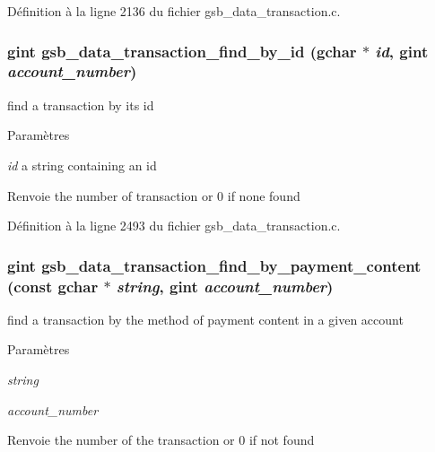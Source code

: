 Définition à la ligne 2136 du fichier gsb\_\-data\_\-transaction.c.

\subsubsection[{gsb\_\-data\_\-transaction\_\-find\_\-by\_\-id}]{\setlength{\rightskip}{0pt plus 5cm}gint gsb\_\-data\_\-transaction\_\-find\_\-by\_\-id (gchar $\ast$ {\em id}, \/  gint {\em account\_\-number})}\label{gsb__data__transaction_8c_a8904a22be0f714a36c52e4924491e959}
find a transaction by its id


\begin{DoxyParams}{Paramètres}
\item[{\em id}]a string containing an id\end{DoxyParams}
\begin{DoxyReturn}{Renvoie}
the number of transaction or 0 if none found 
\end{DoxyReturn}


Définition à la ligne 2493 du fichier gsb\_\-data\_\-transaction.c.

\subsubsection[{gsb\_\-data\_\-transaction\_\-find\_\-by\_\-payment\_\-content}]{\setlength{\rightskip}{0pt plus 5cm}gint gsb\_\-data\_\-transaction\_\-find\_\-by\_\-payment\_\-content (const gchar $\ast$ {\em string}, \/  gint {\em account\_\-number})}\label{gsb__data__transaction_8c_aeb3022dd41bfae50a422aeca94d27d2e}
find a transaction by the method of payment content in a given account


\begin{DoxyParams}{Paramètres}
\item[{\em string}]\item[{\em account\_\-number}]\end{DoxyParams}
\begin{DoxyReturn}{Renvoie}
the number of the transaction or 0 if not found 
\end{DoxyReturn}


